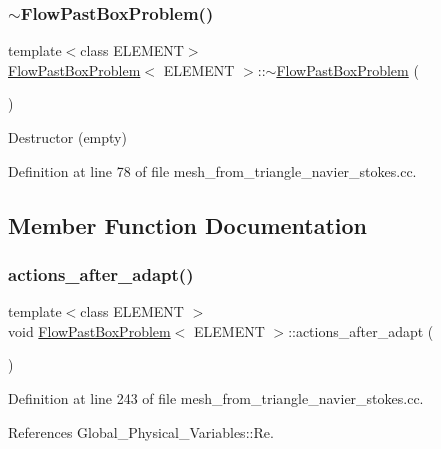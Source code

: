 \subsubsection{\texorpdfstring{$\sim$\+Flow\+Past\+Box\+Problem()}{~FlowPastBoxProblem()}}
{\footnotesize\ttfamily template$<$class E\+L\+E\+M\+E\+NT$>$ \\
\hyperlink{classFlowPastBoxProblem}{Flow\+Past\+Box\+Problem}$<$ E\+L\+E\+M\+E\+NT $>$\+::$\sim$\hyperlink{classFlowPastBoxProblem}{Flow\+Past\+Box\+Problem} (\begin{DoxyParamCaption}{ }\end{DoxyParamCaption})\hspace{0.3cm}{\ttfamily [inline]}}



Destructor (empty) 



Definition at line 78 of file mesh\+\_\+from\+\_\+triangle\+\_\+navier\+\_\+stokes.\+cc.



\subsection{Member Function Documentation}
\mbox{\label{classFlowPastBoxProblem_a726b784a8c4c4cbfff1a870ed9d01d28}} 
\subsubsection{\texorpdfstring{actions\+\_\+after\+\_\+adapt()}{actions\_after\_adapt()}}
{\footnotesize\ttfamily template$<$class E\+L\+E\+M\+E\+NT $>$ \\
void \hyperlink{classFlowPastBoxProblem}{Flow\+Past\+Box\+Problem}$<$ E\+L\+E\+M\+E\+NT $>$\+::actions\+\_\+after\+\_\+adapt (\begin{DoxyParamCaption}{ }\end{DoxyParamCaption})}



Definition at line 243 of file mesh\+\_\+from\+\_\+triangle\+\_\+navier\+\_\+stokes.\+cc.



References Global\+\_\+\+Physical\+\_\+\+Variables\+::\+Re.

